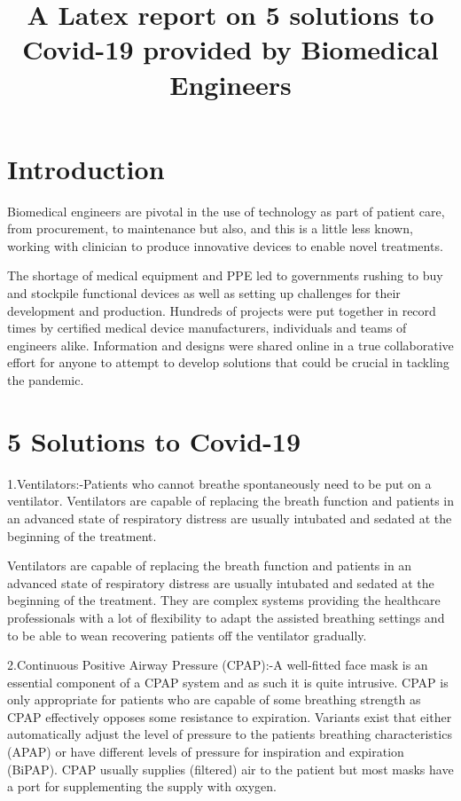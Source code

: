 \documentclass[12pt]{article}
\begin{document}
\title{A Latex report on 5 solutions to Covid-19 provided by Biomedical Engineers}
\maketitle{}

\section{Introduction}
Biomedical engineers are pivotal in the use of technology as part of patient care, from procurement, to maintenance but also, and this is a little less known, working with clinician to produce innovative devices to enable novel treatments.

The shortage of medical equipment and PPE led to governments rushing to buy and stockpile functional devices as well as setting up challenges for their development and production. Hundreds of projects were put together in record times by certified medical device manufacturers, individuals and teams of engineers alike. Information and designs were shared online in a true collaborative effort for anyone to attempt to develop solutions that could be crucial in tackling the pandemic.


\section{5 Solutions to Covid-19}
1.Ventilators:-Patients who cannot breathe spontaneously need to be put on a ventilator. Ventilators are capable of replacing the breath function and patients in an advanced state of respiratory distress are usually intubated and sedated at the beginning of the treatment.

Ventilators are capable of replacing the breath function and patients in an advanced state of respiratory distress are usually intubated and sedated at the beginning of the treatment. They are complex systems providing the healthcare professionals with a lot of flexibility to adapt the assisted breathing settings and to be able to wean recovering patients off the ventilator gradually.

2.Continuous Positive Airway Pressure (CPAP):-A well-fitted face mask is an essential component of a CPAP system and as such it is quite intrusive. CPAP is only appropriate for patients who are capable of some breathing strength as CPAP effectively opposes some resistance to expiration. Variants exist that either automatically adjust the level of pressure to the patients breathing characteristics (APAP) or have different levels of pressure for inspiration and expiration (BiPAP). CPAP usually supplies (filtered) air to the patient but most masks have a port for supplementing the supply with oxygen.
\end{document}
